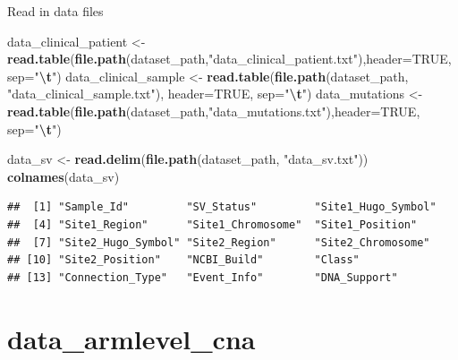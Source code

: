 \documentclass[
]{article}
\newenvironment{Shaded}{\begin{snugshade}}{\end{snugshade}}
\newcommand{\AttributeTok}[1]{\textcolor[rgb]{0.13,0.29,0.53}{#1}}
\newcommand{\ConstantTok}[1]{\textcolor[rgb]{0.56,0.35,0.01}{#1}}
\newcommand{\FunctionTok}[1]{\textcolor[rgb]{0.13,0.29,0.53}{\textbf{#1}}}
\newcommand{\NormalTok}[1]{#1}
\newcommand{\OtherTok}[1]{\textcolor[rgb]{0.56,0.35,0.01}{#1}}
\newcommand{\SpecialCharTok}[1]{\textcolor[rgb]{0.81,0.36,0.00}{\textbf{#1}}}
\newcommand{\StringTok}[1]{\textcolor[rgb]{0.31,0.60,0.02}{#1}}
\begin{document}
Read in data files

\begin{Shaded}
\begin{Highlighting}[]
\NormalTok{data\_clinical\_patient }\OtherTok{\textless{}{-}} \FunctionTok{read.table}\NormalTok{(}\FunctionTok{file.path}\NormalTok{(dataset\_path,}\StringTok{"data\_clinical\_patient.txt"}\NormalTok{),}\AttributeTok{header=}\ConstantTok{TRUE}\NormalTok{, }\AttributeTok{sep=}\StringTok{"}\SpecialCharTok{\textbackslash{}t}\StringTok{"}\NormalTok{)}
\NormalTok{data\_clinical\_sample }\OtherTok{\textless{}{-}} \FunctionTok{read.table}\NormalTok{(}\FunctionTok{file.path}\NormalTok{(dataset\_path, }\StringTok{"data\_clinical\_sample.txt"}\NormalTok{), }\AttributeTok{header=}\ConstantTok{TRUE}\NormalTok{, }\AttributeTok{sep=}\StringTok{"}\SpecialCharTok{\textbackslash{}t}\StringTok{"}\NormalTok{)}
\NormalTok{data\_mutations }\OtherTok{\textless{}{-}} \FunctionTok{read.table}\NormalTok{(}\FunctionTok{file.path}\NormalTok{(dataset\_path,}\StringTok{"data\_mutations.txt"}\NormalTok{),}\AttributeTok{header=}\ConstantTok{TRUE}\NormalTok{, }\AttributeTok{sep=}\StringTok{"}\SpecialCharTok{\textbackslash{}t}\StringTok{"}\NormalTok{)}
\end{Highlighting}
\end{Shaded}

\begin{Shaded}
\begin{Highlighting}[]
\NormalTok{data\_sv }\OtherTok{\textless{}{-}} \FunctionTok{read.delim}\NormalTok{(}\FunctionTok{file.path}\NormalTok{(dataset\_path, }\StringTok{"data\_sv.txt"}\NormalTok{))}
\FunctionTok{colnames}\NormalTok{(data\_sv)}
\end{Highlighting}
\end{Shaded}

\begin{verbatim}
##  [1] "Sample_Id"         "SV_Status"         "Site1_Hugo_Symbol"
##  [4] "Site1_Region"      "Site1_Chromosome"  "Site1_Position"   
##  [7] "Site2_Hugo_Symbol" "Site2_Region"      "Site2_Chromosome" 
## [10] "Site2_Position"    "NCBI_Build"        "Class"            
## [13] "Connection_Type"   "Event_Info"        "DNA_Support"
\end{verbatim}

\section{data\_armlevel\_cna}\label{data_armlevel_cna}
\end{document}

